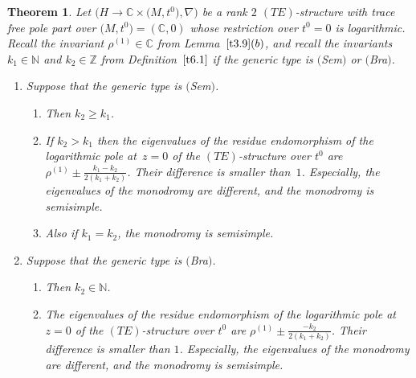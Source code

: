 \documentclass[pdftex]{sigma}%
\numberwithin{equation}{section}
\numberwithin{figure}{section}
\newcommand{\N}{{\mathbb N}}
\newcommand{\Z}{{\mathbb Z}}
\newcommand{\C}{{\mathbb C}}
\newcommand{\nnn}{\nabla}
\newtheorem{Theorem}{Theorem}[section]
\begin{document}
\begin{Theorem}\label{t6.2}
Let $\big(H\to\C\times \big(M,t^0\big),\nnn\big)$ be a rank $2$ $(TE)$-structure
with trace free pole part over $\big(M,t^0\big)=(\C,0)$
whose restriction over $t^0=0$ is logarithmic.
Recall the invariant $\rho^{(1)}\in\C$ from Lemma~$\ref{t3.9}(b)$, and recall the invariants $k_1\in\N$ and $k_2\in\Z$
from Definition~$\ref{t6.1}$
if the generic type is $($Sem$)$ or $($Bra$)$.
\begin{enumerate}\itemsep=0pt
\item[$(a)$] Suppose that the generic type is $($Sem$)$.
\begin{enumerate}\itemsep=0pt
\item[$(i)$] Then $k_2\geq k_1$.

\item[$(ii)$] If $k_2>k_1$ then the eigenvalues of the
residue endomorphism of the logarithmic pole at~$z=0$
of the $(TE)$-structure over $t^0$ are
$\rho^{(1)}\pm \frac{k_1-k_2}{2(k_1+k_2)}$. Their difference
is smaller than~$1$. Especially, the eigenvalues of the
monodromy are different, and the mono\-dromy is semisimple.

\item[$(iii)$] Also if $k_1=k_2$, the monodromy is semisimple.
\end{enumerate}

\item[$(b)$] Suppose that the generic type is $($Bra$)$.
\begin{enumerate}\itemsep=0pt
\item[$(i)$] Then $k_2\in\N$.

\item[$(ii)$] The eigenvalues of the residue endomorphism of the
logarithmic pole at $z=0$ of the $(TE)$-structure over $t^0$
are $\rho^{(1)}\pm \frac{-k_2}{2(k_1+k_2)}$. Their difference
is smaller than $1$. Especially, the eigenvalues of the
monodromy are different, and the monodromy is semisimple.
\end{enumerate}
\end{enumerate}
\end{Theorem}
\end{document}

